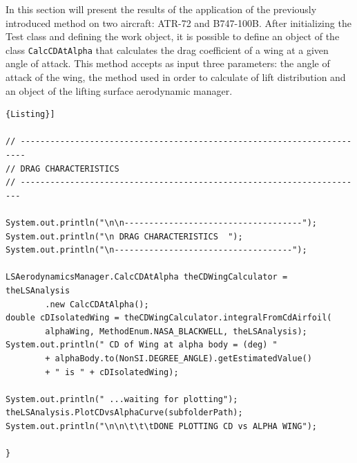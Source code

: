 In this section will present the results of the application of the previously introduced method on two aircraft: ATR-72 and B747-100B.
After initializing the Test class and defining the work object, it is possible to define an object of the class \texttt{CalcCDAtAlpha} that calculates the drag coefficient of a wing at a given angle of attack. This method accepts as input three parameters: the angle of attack of the wing,  the method used in order to calculate of lift distribution and an object of the lifting surface aerodynamic manager.
\noindent \\
\begin{lstlisting}[frame=rbl,caption={{\footnotesize Use of Drag Calculator class}},label= [style=\bfseries]{Listing}]

// -----------------------------------------------------------------------
// DRAG CHARACTERISTICS 
// ----------------------------------------------------------------------

System.out.println("\n\n------------------------------------");
System.out.println("\n DRAG CHARACTERISTICS  ");
System.out.println("\n------------------------------------");

LSAerodynamicsManager.CalcCDAtAlpha theCDWingCalculator = theLSAnalysis
		.new CalcCDAtAlpha();
double cDIsolatedWing = theCDWingCalculator.integralFromCdAirfoil(
		alphaWing, MethodEnum.NASA_BLACKWELL, theLSAnalysis);
System.out.println(" CD of Wing at alpha body = (deg) "
		+ alphaBody.to(NonSI.DEGREE_ANGLE).getEstimatedValue()
		+ " is " + cDIsolatedWing);
	
System.out.println(" ...waiting for plotting");
theLSAnalysis.PlotCDvsAlphaCurve(subfolderPath);
System.out.println("\n\n\t\t\tDONE PLOTTING CD vs ALPHA WING");
			
}
\end{lstlisting}


%
%
%
%
% 
% 
%	 	 

\noindent \\

